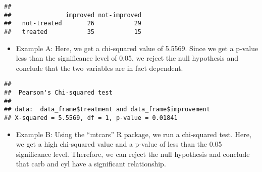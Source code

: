 \documentclass[
]{article}
\newenvironment{Shaded}{\begin{snugshade}}{\end{snugshade}}
\newcommand{\DataTypeTok}[1]{\textcolor[rgb]{0.13,0.29,0.53}{#1}}
\newcommand{\KeywordTok}[1]{\textcolor[rgb]{0.13,0.29,0.53}{\textbf{#1}}}
\newcommand{\NormalTok}[1]{#1}
\newcommand{\OperatorTok}[1]{\textcolor[rgb]{0.81,0.36,0.00}{\textbf{#1}}}
\newcommand{\OtherTok}[1]{\textcolor[rgb]{0.56,0.35,0.01}{#1}}
\newcommand{\StringTok}[1]{\textcolor[rgb]{0.31,0.60,0.02}{#1}}
\providecommand{\tightlist}{%
  \setlength{\itemsep}{0pt}\setlength{\parskip}{0pt}}
\begin{document}
\begin{Shaded}
\end{Shaded}

\begin{verbatim}
##              
##               improved not-improved
##   not-treated       26           29
##   treated           35           15
\end{verbatim}

\begin{itemize}
\tightlist
\item
  Example A: Here, we get a chi-squared value of 5.5569. Since we get a
  p-value less than the significance level of 0.05, we reject the null
  hypothesis and conclude that the two variables are in fact dependent.
\end{itemize}

\begin{Shaded}
\end{Shaded}

\begin{verbatim}
## 
##  Pearson's Chi-squared test
## 
## data:  data_frame$treatment and data_frame$improvement
## X-squared = 5.5569, df = 1, p-value = 0.01841
\end{verbatim}

\begin{itemize}
\tightlist
\item
  Example B: Using the ``mtcars'' R package, we run a chi-squared test.
  Here, we get a high chi-squared value and a p-value of less than the
  0.05 significance level. Therefore, we can reject the null hypothesis
  and conclude that carb and cyl have a significant relationship.
\end{itemize}

\begin{Shaded}
\end{Shaded}
\end{document}
